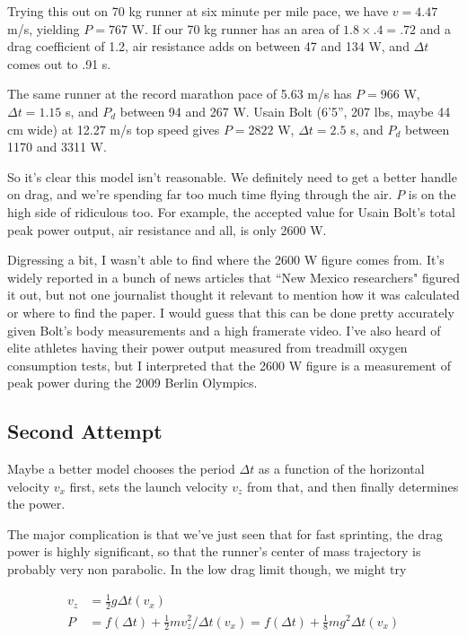 \documentclass[12pt]{article}
\begin{document}
Trying this out on 70 kg runner at six minute per mile pace, we have \(v = 4.47\) m/s, yielding \(P = 767\) W. If our 70 kg runner has an area of \(1.8 \times .4 = .72\) \msq and a drag coefficient of 1.2, air resistance adds on between 47 and 134 W, and \(\Delta t\) comes out to .91 s.

The same runner at the record marathon pace of 5.63 m/s has \(P = 966\) W, \(\Delta t = 1.15\) s, and \(P_d\) between 94 and 267 W. Usain Bolt (6'5'', 207 lbs, maybe 44 cm wide) at 12.27 m/s top speed gives \(P = 2822\) W, \(\Delta t = 2.5\) s, and \(P_d\) between 1170 and 3311 W.

So it's clear this model isn't reasonable. We definitely need to get a better handle on drag, and we're spending far too much time flying through the air. \(P\) is on the high side of ridiculous too. For example, the accepted value for Usain Bolt's total peak power output, air resistance and all, is only 2600 W.

Digressing a bit, I wasn't able to find where the 2600 W figure comes from. It's widely reported in a bunch of news articles that ``New Mexico researchers" figured it out, but not one journalist thought it relevant to mention how it was calculated or where to find the paper. I would guess that this can be done pretty accurately given Bolt's body measurements and a high framerate video. I've also heard of elite athletes having their power output measured from treadmill oxygen consumption tests, but I interpreted that the 2600 W figure is a measurement of peak power during the 2009 Berlin Olympics.

\subsection{Second Attempt}

Maybe a better model chooses the period \(\Delta t\) as a function of the horizontal velocity \(v_x\) first, sets the launch velocity \(v_z\) from that, and then finally determines the power.

The major complication is that we've just seen that for fast sprinting, the drag power is highly significant, so that the runner's center of mass trajectory is probably very non parabolic. In the low drag limit though, we might try

\begin{align*}
v_z &= \frac{1}{2}g\Delta t(v_x) \\[11pt]
P &= f(\Delta t) + \frac{1}{2}m v_z^2 / \Delta t(v_x) = f(\Delta t) + \frac{1}{8}mg^2\Delta t(v_x)
\end{align*}
\end{document}
